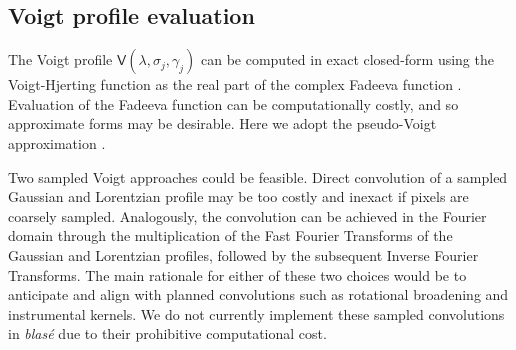 \documentclass[modern]{aastex631}
\begin{document}
\subsection{Voigt profile evaluation}
The Voigt profile $\mathsf{V}(\lambda, \sigma_j, \gamma_j)$ can be computed in exact closed-form using the Voigt-Hjerting function \citep{1938ApJ....88..508H} as the real part of the complex Fadeeva function \citep[\emph{e.g.}][]{2011arXiv1106.0151Z}. Evaluation of the Fadeeva function can be computationally costly, and so approximate forms may be desirable. Here we adopt the pseudo-Voigt approximation \citep{Ida:nt0146}.

Two sampled Voigt approaches could be feasible. Direct convolution of a sampled Gaussian and Lorentzian profile may be too costly and inexact if pixels are coarsely sampled. Analogously, the convolution can be achieved in the Fourier domain through the multiplication of the Fast Fourier Transforms of the Gaussian and Lorentzian profiles, followed by the subsequent Inverse Fourier Transforms. The main rationale for either of these two choices would be to anticipate and align with planned convolutions such as rotational broadening and instrumental kernels. We do not currently implement these sampled convolutions in \emph{blas\'e} due to their prohibitive computational cost.
\end{document}
